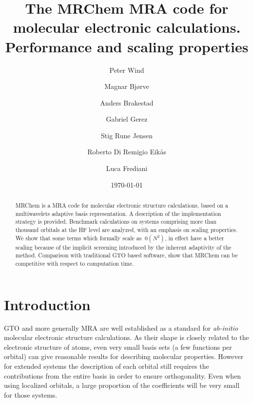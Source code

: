 \documentclass[%
 aip,
 amsmath,amssymb,
 reprint,%
]{revtex4-1}
\begin{document}

\title[MRChem]{The MRChem MRA code for molecular electronic calculations. Performance and scaling properties}
\author{Peter Wind}
\author{Magnar Bjørve}
\author{Anders Brakestad}
\author{Gabriel Gerez}
\author{Stig Rune Jensen}
\author{Roberto Di Remigio Eikås}
\author{Luca Frediani}




\date{\today}

\begin{abstract}
MRChem is a MRA code for molecular electronic structure calculations, based on a multiwavelets adaptive basis representation. A description of the implementation strategy is provided. Benchmark calculations on systems comprising more than thousand orbitals at the HF level are analyzed, with an emphasis on scaling properties. 
We show that some terms which formally scale as $~0(N^2)$, in effect have a better scaling because of the implicit screening introduced by the inherent adaptivity of the method. Comparison with traditional GTO based software, show that MRChem can be competitive with respect to computation time.

\end{abstract}

\maketitle

\section{Introduction}


GTO and more generally MRA are well established as a standard for \emph{ab-initio} molecular electronic structure calculations. As their shape is closely related to the electronic structure of atoms, even very small basis sets (a few functions per orbital) can give reasonable results for describing molecular properties. However for extended systems the description of each orbital still requires the contributions from the entire basis in order to ensure orthogonality. Even when using localized orbitals, a large proportion of the coefficients will be very small for those systems.
\end{document}
